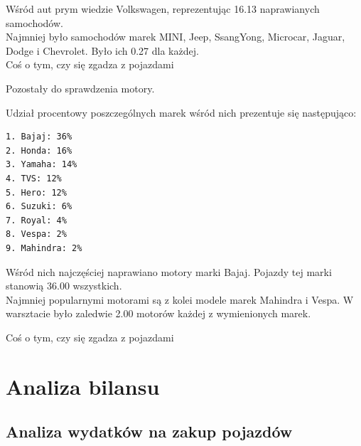 \documentclass{article}\usepackage[]{graphicx}\usepackage[]{xcolor}
\begin{document}
Wśród aut prym wiedzie Volkswagen, reprezentując  16.13 naprawianych samochodów. \\

Najmniej było samochodów marek MINI, Jeep, SsangYong, Microcar, Jaguar, Dodge i Chevrolet. Było ich 0.27 dla każdej. \\

{\color{red} Coś o tym, czy się zgadza z pojazdami}

Pozostały do sprawdzenia motory.



Udział procentowy poszczególnych marek wśród nich prezentuje się następująco:

\begin{verbatim}
1. Bajaj: 36%
2. Honda: 16%
3. Yamaha: 14%
4. TVS: 12%
5. Hero: 12%
6. Suzuki: 6%
7. Royal: 4%
8. Vespa: 2%
9. Mahindra: 2%
\end{verbatim}

Wśród nich najczęściej naprawiano motory marki Bajaj. Pojazdy tej marki stanowią 36.00 wszystkich. \\

Najmniej popularnymi motorami są z kolei modele marek Mahindra i Vespa. W warsztacie było zaledwie 2.00 motorów każdej z wymienionych marek.

{\color{red} Coś o tym, czy się zgadza z pojazdami}

\section{Analiza bilansu}

\subsection{Analiza wydatków na zakup pojazdów}
\end{document}
